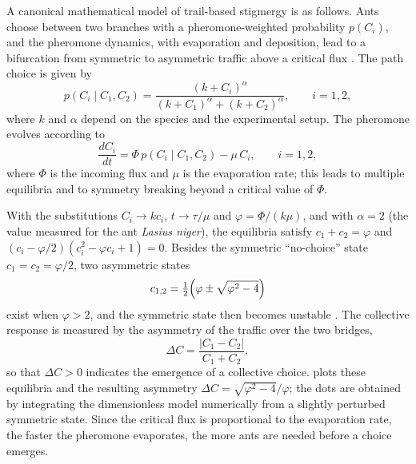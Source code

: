 A canonical mathematical model of trail-based stigmergy is as follows. Ants
choose between two branches with a pheromone-weighted probability $p(C_i)$, and
the pheromone dynamics, with evaporation and deposition, lead to a bifurcation
from symmetric to asymmetric traffic above a critical flux \cite{garnier2007biological}. The path
choice is given by
\begin{equation}
  p\left(C_i \mid C_1, C_2\right)
    = \frac{(k + C_i)^{\alpha}}{(k + C_1)^{\alpha} + (k + C_2)^{\alpha}},
    \qquad i = 1, 2,
  \label{eq:trail-choice}
\end{equation}
where $k$ and $\alpha$ depend on the species and the experimental setup. The
pheromone evolves according to
\begin{equation}
  \frac{dC_i}{dt} = \Phi\, p\left(C_i \mid C_1, C_2\right) - \mu\, C_i,
    \qquad i = 1, 2,
  \label{eq:pheromone-dynamics}
\end{equation}
where $\Phi$ is the incoming flux and $\mu$ is the evaporation rate; this leads
to multiple equilibria and to symmetry breaking beyond a critical value of
$\Phi$.

With the substitutions $C_i \to k c_i$, $t \to \tau/\mu$ and
$\varphi = \Phi/(k\mu)$, and with $\alpha = 2$ (the value measured for the ant
\emph{Lasius niger}), the equilibria satisfy $c_1 + c_2 = \varphi$ and
$(c_i - \varphi/2)(c_i^2 - \varphi c_i + 1) = 0$. Besides the symmetric
``no-choice'' state $c_1 = c_2 = \varphi/2$, two asymmetric states
\begin{equation}
  c_{1,2} = \tfrac{1}{2}\Bigl(\varphi \pm \sqrt{\varphi^2 - 4}\Bigr)
  \label{eq:trail-equilibria}
\end{equation}
exist when $\varphi > 2$, and the symmetric state then becomes unstable
\cite{garnier2007biological}. The collective response is measured by the
asymmetry of the traffic over the two bridges,
\begin{equation}
  \Delta C = \frac{\left|C_1 - C_2\right|}{C_1 + C_2},
  \label{eq:asymmetry}
\end{equation}
so that $\Delta C > 0$ indicates the emergence of a collective choice.
 plots these equilibria and the resulting asymmetry
$\Delta C = \sqrt{\varphi^2 - 4}/\varphi$; the dots are obtained by integrating
the dimensionless model numerically from a slightly perturbed symmetric state.
Since the critical flux is proportional to the evaporation rate, the faster the
pheromone evaporates, the more ants are needed before a choice emerges.

